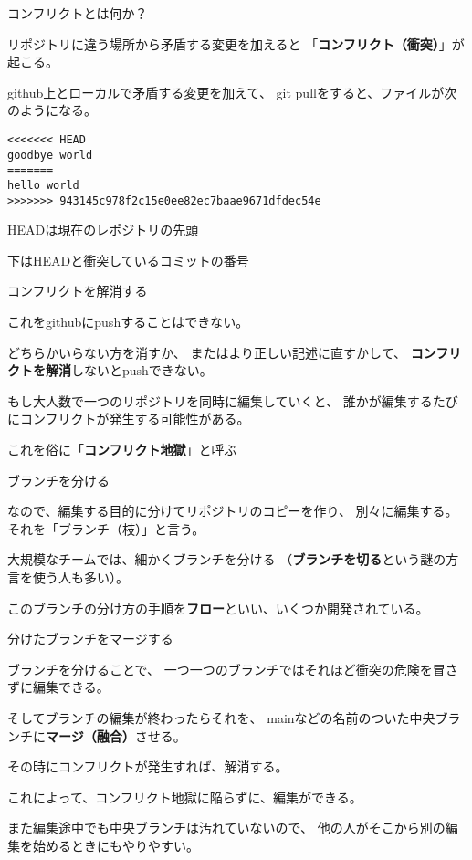 \documentclass[12pt, unicode]{beamer}
\begin{document}
\begin{frame}[fragile]{コンフリクトとは何か？}

リポジトリに違う場所から矛盾する変更を加えると
「\textbf{コンフリクト（衝突）}」が起こる。

github上とローカルで矛盾する変更を加えて、
git pullをすると、ファイルが次のようになる。

\begin{verbatim}
<<<<<<< HEAD
goodbye world
=======
hello world
>>>>>>> 943145c978f2c15e0ee82ec7baae9671dfdec54e
\end{verbatim}

HEADは現在のレポジトリの先頭

下はHEADと衝突しているコミットの番号

\end{frame}
\begin{frame}{コンフリクトを解消する}

これをgithubにpushすることはできない。

どちらかいらない方を消すか、
またはより正しい記述に直すかして、
\textbf{コンフリクトを解消}しないとpushできない。

もし大人数で一つのリポジトリを同時に編集していくと、
誰かが編集するたびにコンフリクトが発生する可能性がある。

これを俗に「\textbf{コンフリクト地獄}」と呼ぶ

\end{frame}
\begin{frame}{ブランチを分ける}

なので、編集する目的に分けてリポジトリのコピーを作り、
別々に編集する。
それを「ブランチ（枝）」と言う。

大規模なチームでは、細かくブランチを分ける
（\textbf{ブランチを切る}という謎の方言を使う人も多い）。

このブランチの分け方の手順を\textbf{フロー}といい、いくつか開発されている。

\end{frame}
\begin{frame}{分けたブランチをマージする}

ブランチを分けることで、
一つ一つのブランチではそれほど衝突の危険を冒さずに編集できる。

そしてブランチの編集が終わったらそれを、
mainなどの名前のついた中央ブランチに\textbf{マージ（融合）}させる。

その時にコンフリクトが発生すれば、解消する。

これによって、コンフリクト地獄に陥らずに、編集ができる。

また編集途中でも中央ブランチは汚れていないので、
他の人がそこから別の編集を始めるときにもやりやすい。

\end{frame}
\end{document}
